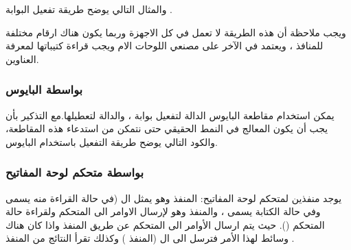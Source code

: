 \documentclass[document.tex]{subfiles}
\begin{document}
والمثال التالي يوضح طريقة تفعيل البوابة .


\begin{english}
\lstset{numberstyle=\tiny,numbers=left,stepnumber=1,numbersep=5pt,tabsize=2,extendedchars=true,breaklines=true,frame=b,showspaces=false, showtabs=false,xleftmargin=10pt,framexleftmargin=10pt,framexrightmargin=5pt,framexbottommargin=4pt,showstringspaces=false,language=[x86masm]Assembler}


\end{english}

ويجب ملاحظة أن هذه الطريقة لا تعمل في كل الاجهزة وربما يكون هناك ارقام مختلفة للمنافذ ، ويعتمد في الآخر على مصنعي اللوحات الام ويجب قراءة كتيباتها لمعرفة العناوين.

\subsubsection{بواسطة البايوس}
يمكن استخدام مقاطعة البايوس  الدالة  لتفعيل بوابة  ، والدالة  لتعطيلها.مع التذكير بأن يجب أن يكون المعالج في النمط الحقيقي حتى نتمكن من استدعاء هذه المقاطعة، والكود التالي يوضح طريقة التفعيل باستخدام البايوس.

\begin{english}
\lstset{numberstyle=\tiny,numbers=left,stepnumber=1,numbersep=5pt,tabsize=2,extendedchars=true,breaklines=true,frame=b,showspaces=false, showtabs=false,xleftmargin=10pt,framexleftmargin=10pt,framexrightmargin=5pt,framexbottommargin=4pt,showstringspaces=false,language=[x86masm]Assembler}


\end{english}

\subsubsection{بواسطة متحكم لوحة المفاتيح}
يوجد منفذين لمتحكم لوحة المفاتيح: المنفذ  وهو يمثل ال  (في حالة القراءة منه يسمى  وفي حالة الكتابة يسمى ، والمنفذ  وهو لإرسال الاوامر الى المتحكم ولقراءة حالة المتحكم (). حيث يتم ارسال الأوامر الى المتحكم عن طريق المنفذ  واذا كان هناك وسائط لهذا الأمر فترسل الى ال  (المنفذ ) وكذلك تقرأ النتائج من المنفذ .
\end{document}
